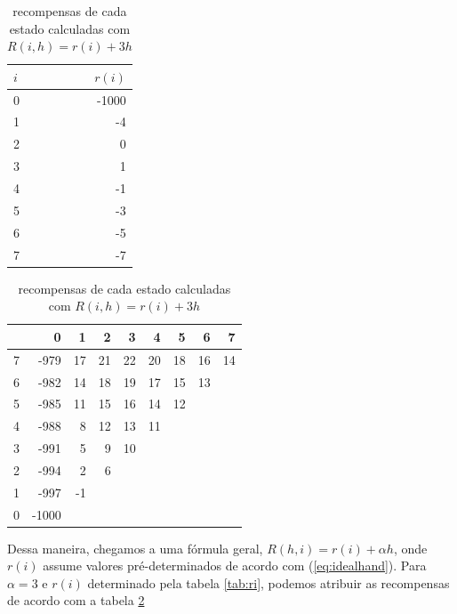 \documentclass{book}
\begin{document}
\begin{table}[!b]

\parbox{.45\linewidth}{
\centering
\vspace{0.2cm}
\begin{tabular}{l|r}
$i$  & $r(i)$ \\ \hline
0 & -1000  \\
1 & -4     \\
2 & 0      \\
3 & 1      \\
4 & -1     \\
5 & -3     \\
6 & -5     \\
7 & -7
\end{tabular}
\caption{recompensas-base para $i = 0, \ldots, 7$}
\label{tab:ri}
}
\hfill
\parbox{.45\linewidth}{
\centering
\begin{tabular}{l|rrrrrrrr}
  & 0     & 1  & 2  & 3  & 4  & 5  & 6  & 7  \\ \hline
7 & -979  & 17 & 21 & 22 & 20 & 18 & 16 & 14 \\
6 & -982  & 14 & 18 & 19 & 17 & 15 & 13 &    \\
5 & -985  & 11 & 15 & 16 & 14 & 12 &    &    \\
4 & -988  & 8  & 12 & 13 & 11 &    &    &    \\
3 & -991  & 5  & 9  & 10 &    &    &    &    \\
2 & -994  & 2  & 6  &    &    &    &    &    \\
1 & -997  & -1 &    &    &    &    &    &    \\
0 & -1000 &    &    &    &    &    &    &
\end{tabular}
\caption{recompensas de cada estado calculadas com $R(i,h) = r(i) + 3h$}
\label{tab:Rhi}
}
\end{table}

Dessa maneira, chegamos a uma fórmula geral, $R(h, i) = r(i) + \alpha h$, onde $r(i)$ assume valores pré-determinados de acordo com (\ref{eq:idealhand}). Para $\alpha = 3$ e $r(i)$ determinado pela tabela \ref{tab:ri}, podemos atribuir as recompensas de acordo com a tabela \ref{tab:Rhi}
\end{document}
